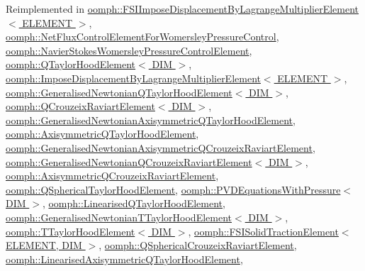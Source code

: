 Reimplemented in \hyperlink{classoomph_1_1FSIImposeDisplacementByLagrangeMultiplierElement_ad34707237f7a7bdeb3b89cff465ecb67}{oomph\+::\+F\+S\+I\+Impose\+Displacement\+By\+Lagrange\+Multiplier\+Element$<$ E\+L\+E\+M\+E\+N\+T $>$}, \hyperlink{classoomph_1_1NetFluxControlElementForWomersleyPressureControl_a538b22e5aceecf140d03e400a8848a33}{oomph\+::\+Net\+Flux\+Control\+Element\+For\+Womersley\+Pressure\+Control}, \hyperlink{classoomph_1_1NavierStokesWomersleyPressureControlElement_a65a9d8901d8d0690f82b873c0dafe1bd}{oomph\+::\+Navier\+Stokes\+Womersley\+Pressure\+Control\+Element}, \hyperlink{classoomph_1_1QTaylorHoodElement_a14a90f0ce2b19d79ed9bc9b755e0b2d2}{oomph\+::\+Q\+Taylor\+Hood\+Element$<$ D\+I\+M $>$}, \hyperlink{classoomph_1_1ImposeDisplacementByLagrangeMultiplierElement_a321d06e523a87b42c25ac14a11229ee7}{oomph\+::\+Impose\+Displacement\+By\+Lagrange\+Multiplier\+Element$<$ E\+L\+E\+M\+E\+N\+T $>$}, \hyperlink{classoomph_1_1GeneralisedNewtonianQTaylorHoodElement_a526d20c2aaa5f0ba68436a06de012443}{oomph\+::\+Generalised\+Newtonian\+Q\+Taylor\+Hood\+Element$<$ D\+I\+M $>$}, \hyperlink{classoomph_1_1QCrouzeixRaviartElement_ad252ba37ecfb028ccd851ab6600d4df3}{oomph\+::\+Q\+Crouzeix\+Raviart\+Element$<$ D\+I\+M $>$}, \hyperlink{classoomph_1_1GeneralisedNewtonianAxisymmetricQTaylorHoodElement_a4327576642aa78c8aadc175f44c85c17}{oomph\+::\+Generalised\+Newtonian\+Axisymmetric\+Q\+Taylor\+Hood\+Element}, \hyperlink{classoomph_1_1AxisymmetricQTaylorHoodElement_a9cd3bbcb75c7a4501c3de68e524a5503}{oomph\+::\+Axisymmetric\+Q\+Taylor\+Hood\+Element}, \hyperlink{classoomph_1_1GeneralisedNewtonianAxisymmetricQCrouzeixRaviartElement_adabb660209259f2ac02d996e8401fc34}{oomph\+::\+Generalised\+Newtonian\+Axisymmetric\+Q\+Crouzeix\+Raviart\+Element}, \hyperlink{classoomph_1_1GeneralisedNewtonianQCrouzeixRaviartElement_ab29a7d2d94cc785438a76986b36de0a3}{oomph\+::\+Generalised\+Newtonian\+Q\+Crouzeix\+Raviart\+Element$<$ D\+I\+M $>$}, \hyperlink{classoomph_1_1AxisymmetricQCrouzeixRaviartElement_a85c8740ef4dd17626ae47c9344e15ae8}{oomph\+::\+Axisymmetric\+Q\+Crouzeix\+Raviart\+Element}, \hyperlink{classoomph_1_1QSphericalTaylorHoodElement_a3417f97997b87a5cddc499697e227717}{oomph\+::\+Q\+Spherical\+Taylor\+Hood\+Element}, \hyperlink{classoomph_1_1PVDEquationsWithPressure_ac7b6036faac154cd6a535ab5083c6d84}{oomph\+::\+P\+V\+D\+Equations\+With\+Pressure$<$ D\+I\+M $>$}, \hyperlink{classoomph_1_1LinearisedQTaylorHoodElement_a2cd2df4e56d4bd418e63ce1d15336082}{oomph\+::\+Linearised\+Q\+Taylor\+Hood\+Element}, \hyperlink{classoomph_1_1GeneralisedNewtonianTTaylorHoodElement_a81b2d392a53657754788c4b9ab3858c1}{oomph\+::\+Generalised\+Newtonian\+T\+Taylor\+Hood\+Element$<$ D\+I\+M $>$}, \hyperlink{classoomph_1_1TTaylorHoodElement_ab4b5b18fb755a690e296b2ed00b32647}{oomph\+::\+T\+Taylor\+Hood\+Element$<$ D\+I\+M $>$}, \hyperlink{classoomph_1_1FSISolidTractionElement_a1b45927afbb43a1808b5857128995ae4}{oomph\+::\+F\+S\+I\+Solid\+Traction\+Element$<$ E\+L\+E\+M\+E\+N\+T, D\+I\+M $>$}, \hyperlink{classoomph_1_1QSphericalCrouzeixRaviartElement_af9984dcf9685e350ebb1173a511c9594}{oomph\+::\+Q\+Spherical\+Crouzeix\+Raviart\+Element}, \hyperlink{classoomph_1_1LinearisedAxisymmetricQTaylorHoodElement_a0aac46cedbfc8cf27644c5b5fd96d7e4}{oomph\+::\+Linearised\+Axisymmetric\+Q\+Taylor\+Hood\+Element}, 